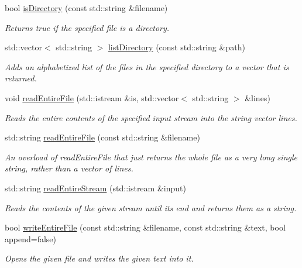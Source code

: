 \begin{DoxyCompactItemize}
bool \mbox{\hyperlink{namespacesgl_1_1priv_1_1filelib_a6d1006668c46c13773e52db398217475}{is\+Directory}} (const std\+::string \&filename)
\begin{DoxyCompactList}\small\item\em Returns {\ttfamily true} if the specified file is a directory. \end{DoxyCompactList}\item 
std\+::vector$<$ std\+::string $>$ \mbox{\hyperlink{namespacesgl_1_1priv_1_1filelib_afe8ff05c7d9ab00c7b8a4d7f6036a0b2}{list\+Directory}} (const std\+::string \&path)
\begin{DoxyCompactList}\small\item\em Adds an alphabetized list of the files in the specified directory to a vector that is returned. \end{DoxyCompactList}\item 
void \mbox{\hyperlink{namespacesgl_1_1priv_1_1filelib_ad01c76fd8c527f7dd7dee39fb4597739}{read\+Entire\+File}} (std\+::istream \&is, std\+::vector$<$ std\+::string $>$ \&lines)
\begin{DoxyCompactList}\small\item\em Reads the entire contents of the specified input stream into the string vector {\ttfamily lines}. \end{DoxyCompactList}\item 
std\+::string \mbox{\hyperlink{namespacesgl_1_1priv_1_1filelib_a86c5d6683613361160de27acd5f5a243}{read\+Entire\+File}} (const std\+::string \&filename)
\begin{DoxyCompactList}\small\item\em An overload of read\+Entire\+File that just returns the whole file as a very long single string, rather than a vector of lines. \end{DoxyCompactList}\item 
std\+::string \mbox{\hyperlink{namespacesgl_1_1priv_1_1filelib_adb97dddab428509c4f231f8ecfaa095e}{read\+Entire\+Stream}} (std\+::istream \&input)
\begin{DoxyCompactList}\small\item\em Reads the contents of the given stream until its end and returns them as a string. \end{DoxyCompactList}\item 
bool \mbox{\hyperlink{namespacesgl_1_1priv_1_1filelib_a4cbf54fb7425b655a19f0aa36f6bfdc2}{write\+Entire\+File}} (const std\+::string \&filename, const std\+::string \&text, bool append=false)
\begin{DoxyCompactList}\small\item\em Opens the given file and writes the given text into it. \end{DoxyCompactList}\end{DoxyCompactItemize}


